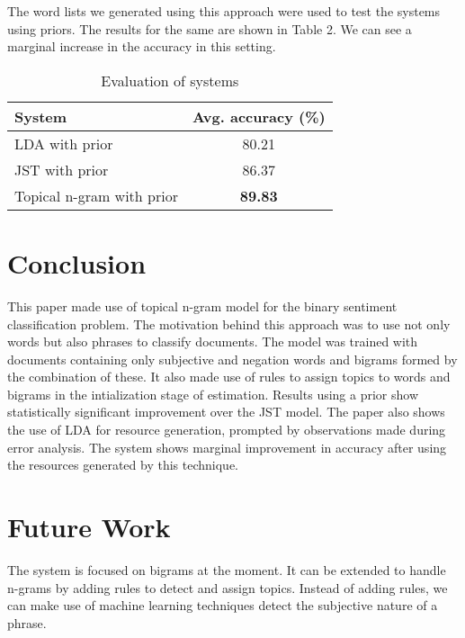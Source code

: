 \documentclass[11pt]{article}
\begin{document}
The word lists we generated using this approach were used to test the systems using priors. The results for the same
are shown in Table 2. We can see a marginal increase in the accuracy in this setting.

\begin{table}[h]
\begin{center}
\begin{tabular}{|l|c|}
\hline \bf System & \bf Avg. accuracy (\%)\\ \hline
LDA with prior & 80.21\\
JST with prior & 86.37\\
Topical n-gram with prior & \textbf{89.83}\\
\hline
\end{tabular}
\end{center}
\caption{\label{result-table} Evaluation of systems}
\end{table}

\section{Conclusion}\label{conclusion}

This paper made use of topical n-gram model for the binary sentiment classification problem. The motivation behind this
approach was to use not only words but also phrases to classify documents. The model was trained with documents containing
only subjective and negation words and bigrams formed by the combination of these. It also made use of rules to 
assign topics to words and bigrams in the intialization stage of estimation. Results using a prior show statistically 
significant improvement over the JST model. The paper also shows the use of LDA for resource generation, prompted by 
observations made during error analysis. The system shows marginal improvement in accuracy after using the resources
generated by this technique.

\section{Future Work}\label{futurework}

The system is focused on bigrams at the moment. It can be extended to handle n-grams by adding rules to detect and assign
topics. Instead of adding rules, we can make use of machine learning techniques detect the subjective nature of a phrase.

%
%
\end{document}
